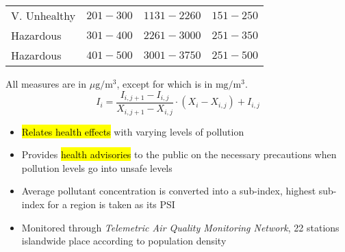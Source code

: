 \documentclass{article}
\begin{document}
\begin{multicols*}{4}
\begin{center}
\begin{tabular}{l|c|c|c}
    V. Unhealthy & $201-300$ & $1131-2260$    & $151-250$           \\
    Hazardous    & $301-400$ & $2261-3000$    & $251-350$           \\
    Hazardous    & $401-500$ & $3001-3750$    & $251-500$           \\
\end{tabular}\end{center}
All measures are in $\mu\mathrm{g/m^3}$, except for  which is in
$\mathrm{mg/m^3}$.
$$ I_i = 
    \frac{I_{i, j+1} - I_{i, j}}{X_{i, j+1} - X_{i, j}} 
    \cdot (X_i - X_{i,j})
    + I_{i, j} $$
\begin{itemize} \itemsep -0.5em
    \item \hl{Relates health effects} with varying levels of pollution
    \item Provides \hl{health advisories} to the public on the necessary precautions
        when pollution levels go into unsafe levels
    \item Average pollutant concentration is converted into a sub-index, highest
        sub-index for a region is taken as its PSI
    \item Monitored through \textit{Telemetric Air Quality Monitoring Network}, 22
        stations islandwide place according to population density
\end{itemize}

\end{multicols*}
\end{document}
